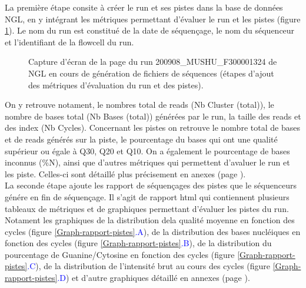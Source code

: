 La première étape consite à créer le run et ses pistes dans la base de données NGL, en y intégrant les métriques permettant d'évaluer le run et les pistes (figure \ref{NGL-screenshot_run-lane}).
Le nom du run est constitué de la date de séquençage, le nom du séquenceur et l'identifiant de la flowcell du run.

\begin{figure}[H]
    \centering
    \caption{\footnotesize{Capture d'écran de la page du run 200908\_MUSHU\_F300001324 de NGL en cours de génération de fichiers de séquences (étapes d'ajout des métriques d'évaluation du run et des pistes).}}
    \label{NGL-screenshot_run-lane}
\end{figure}

On y retrouve notament, le nombres total de reads (Nb Cluster (total)), le nombre de bases total (Nb Bases (total)) générées par le run, la taille des reads et des index (Nb Cycles).
Concernant les pistes on retrouve le nombre total de bases et de reads générés sur la piste, le pourcentage du bases qui ont une qualité supérieur ou égale à Q30, Q20 et Q10. On a également le pourcentage de bases inconnus (\%N), ainsi que d'autres métriques qui permettent d'avaluer le run et les piste. Celles-ci sont détaillé plus précisement en anexes (page \pageref{anexes1}).\\

La seconde étape ajoute les rapport de séquençages des pistes que le séquenceurs génére en fin de séquençage.
Il s'agit de rapport html qui contiennent plusieurs tableaux de métriques et de graphiques permettant d'évaluer les pistes du run.
Notament les graphiques de la distribution dela qualité moyenne en fonction des cycles (figure \ref{Graph-rapport-pistes}\textcolor{blue}{.A}), de la distribution des bases nucléiques en fonction des cycles (figure \ref{Graph-rapport-pistes}\textcolor{blue}{.B}), de la distribution du pourcentage de Guanine/Cytosine en fonction des cycles (figure \ref{Graph-rapport-pistes}\textcolor{blue}{.C}), de la distribution de l'intensité brut au cours des cycles (figure \ref{Graph-rapport-pistes}\textcolor{blue}{.D}) et d'autre graphiques détaillé en annexes (page \pageref{anexes2}).

